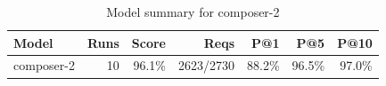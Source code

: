 \begin{table}[htbp]
\centering
\begin{tabular}{lrrrrrr}
\toprule
Model & Runs & Score & Reqs & P@1 & P@5 & P@10 \\
\midrule
composer-2 & 10 & 96.1\% & 2623/2730 & 88.2\% & 96.5\% & 97.0\% \\
\bottomrule
\end{tabular}
\caption{Model summary for composer-2}
\end{table}
